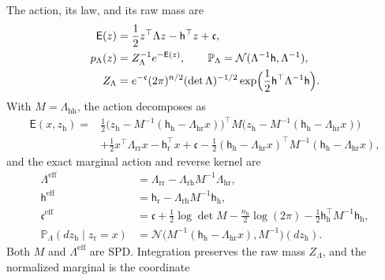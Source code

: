 The action, its law, and its raw mass are
\begin{equation}
\begin{aligned}
\mathsf E(z)&=\frac12z^\top\Lambda z-\mathsf h^\top z+\mathfrak c,\\
p_\Lambda(z)&=Z_\Lambda^{-1}e^{-\mathsf E(z)},\qquad
\mathbb P_\Lambda=\mathcal N(\Lambda^{-1}\mathsf h,\Lambda^{-1}),\\
Z_\Lambda&=e^{-\mathfrak c}(2\pi)^{n/2}
(\det\Lambda)^{-1/2}
\exp\Bigl(\frac12\mathsf h^\top\Lambda^{-1}\mathsf h\Bigr).
\end{aligned}
\label{eq:cg-kron-normalized-prior}
\end{equation}
With \(M=\Lambda_{\mathrm{hh}}\), the action decomposes as
\begin{equation}
\begin{aligned}
\mathsf E(x,z_{\mathrm h})
={}&\frac12
\bigl(z_{\mathrm h}-M^{-1}(\mathsf h_{\mathrm h}-\Lambda_{\mathrm{hr}}x)\bigr)^\top
M\bigl(z_{\mathrm h}-M^{-1}(\mathsf h_{\mathrm h}-\Lambda_{\mathrm{hr}}x)\bigr)\\
&+\frac12x^\top\Lambda_{\mathrm{rr}}x-\mathsf h_{\mathrm r}^\top x+\mathfrak c
-\frac12(\mathsf h_{\mathrm h}-\Lambda_{\mathrm{hr}}x)^\top
M^{-1}(\mathsf h_{\mathrm h}-\Lambda_{\mathrm{hr}}x),
\end{aligned}
\label{eq:cg-kron-completed-square}
\end{equation}
and the exact marginal action and reverse kernel are
\begin{equation}
\begin{aligned}
\Lambda^{\mathrm{eff}}
 &=\Lambda_{\mathrm{rr}}-\Lambda_{\mathrm{rh}}M^{-1}\Lambda_{\mathrm{hr}},\\
\mathsf h^{\mathrm{eff}}
 &=\mathsf h_{\mathrm r}-\Lambda_{\mathrm{rh}}M^{-1}\mathsf h_{\mathrm h},\\
\mathfrak c^{\mathrm{eff}}
 &=\mathfrak c+\frac12\log\det M-\frac{n_{\mathrm h}}{2}\log(2\pi)
                     -\frac12\mathsf h_{\mathrm h}^\top M^{-1}\mathsf h_{\mathrm h},\\
\mathbb P_\Lambda(dz_{\mathrm h}\mid z_{\mathrm r}=x)
 &=\mathcal N\bigl(M^{-1}(\mathsf h_{\mathrm h}-\Lambda_{\mathrm{hr}}x),M^{-1}\bigr)(dz_{\mathrm h}).
\end{aligned}
\label{eq:cg-kron-complete-schur}
\end{equation}
Both \(M\) and \(\Lambda^{\mathrm{eff}}\) are SPD. Integration preserves the
raw mass \(Z_\Lambda\), and the normalized marginal is the coordinate
